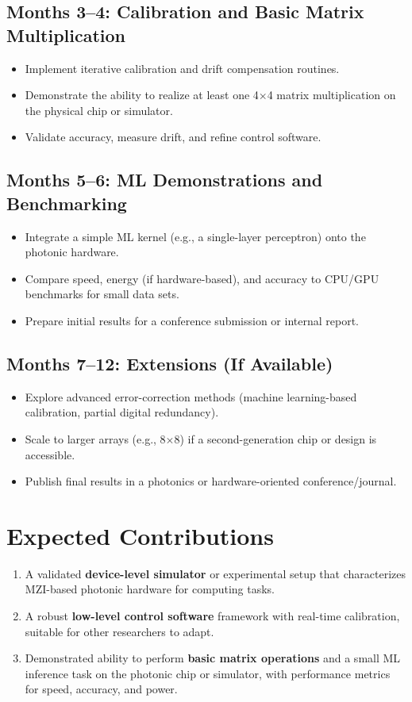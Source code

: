 \documentclass[conference]{IEEEtran}
\begin{document}
\subsection{Months 3--4: Calibration and Basic Matrix Multiplication}
\begin{itemize}
    \item Implement iterative calibration and drift compensation routines.
    \item Demonstrate the ability to realize at least one 4$\times$4 matrix multiplication on the physical chip or simulator.
    \item Validate accuracy, measure drift, and refine control software.
\end{itemize}

\subsection{Months 5--6: ML Demonstrations and Benchmarking}
\begin{itemize}
    \item Integrate a simple ML kernel (e.g., a single-layer perceptron) onto the photonic hardware.
    \item Compare speed, energy (if hardware-based), and accuracy to CPU/GPU benchmarks for small data sets.
    \item Prepare initial results for a conference submission or internal report.
\end{itemize}

\subsection{Months 7--12: Extensions (If Available)}
\begin{itemize}
    \item Explore advanced error-correction methods (machine learning-based calibration, partial digital redundancy).
    \item Scale to larger arrays (e.g., 8$\times$8) if a second-generation chip or design is accessible.
    \item Publish final results in a photonics or hardware-oriented conference/journal.
\end{itemize}

\section{Expected Contributions}
\begin{enumerate}
    \item A validated \textbf{device-level simulator} or experimental setup that characterizes MZI-based photonic hardware for computing tasks.
    \item A robust \textbf{low-level control software} framework with real-time calibration, suitable for other researchers to adapt.
    \item Demonstrated ability to perform \textbf{basic matrix operations} and a small ML inference task on the photonic chip or simulator, with performance metrics for speed, accuracy, and power.
\end{enumerate}
\end{document}
